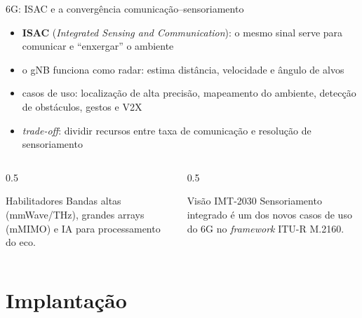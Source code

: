 \documentclass[aspectratio=169,11pt]{beamer}
\begin{document}
\begin{frame}{6G: ISAC e a convergência comunicação--sensoriamento}
  \begin{itemize}
    \item \textbf{ISAC} (\emph{Integrated Sensing and Communication}): o mesmo sinal serve para comunicar e ``enxergar'' o ambiente
    \item o gNB funciona como radar: estima distância, velocidade e ângulo de alvos
    \item casos de uso: localização de alta precisão, mapeamento do ambiente, detecção de obstáculos, gestos e V2X
    \item \emph{trade-off}: dividir recursos entre taxa de comunicação e resolução de sensoriamento
  \end{itemize}
  \begin{columns}
    \begin{column}{0.5\textwidth}
      \begin{block}{Habilitadores}
        Bandas altas (mmWave/THz), grandes arrays (mMIMO) e IA para processamento do eco.
      \end{block}
    \end{column}
    \begin{column}{0.5\textwidth}
      \begin{alertblock}{Visão IMT-2030}
        Sensoriamento integrado é um dos novos casos de uso do 6G no \emph{framework} ITU-R M.2160.
      \end{alertblock}
    \end{column}
  \end{columns}
\end{frame}

\section{Implantação}
\end{document}
